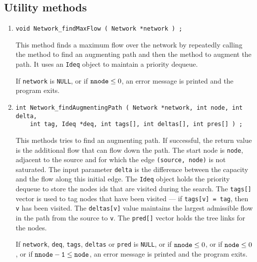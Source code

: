 \subsection{Utility methods}
\label{subsection:Network:proto:utilities}
\par
\begin{enumerate}
\item
\begin{verbatim}
void Network_findMaxFlow ( Network *network ) ;
\end{verbatim}
This method finds a maximum flow over the network by repeatedly
calling the method to find an augmenting path and then the method
to augment the path.
It uses an {\tt Ideq} object to maintain a priority dequeue.
\par {}
If {\tt network} is {\tt NULL},
or if ${\tt nnode} \le 0$,
an error message is printed and the program exits.
\item
\begin{verbatim}
int Network_findAugmentingPath ( Network *network, int node, int delta, 
    int tag, Ideq *deq, int tags[], int deltas[], int pres[] ) ;
\end{verbatim}
This methods tries to find an augmenting path.
If successful, the return value is the additional flow that can
flow down the path.
The start node is {\tt node}, adjacent to the source and for which
the edge {\tt (source, node)} is not saturated.
The input parameter {\tt delta} is the difference between the
capacity and the flow along this initial edge.
The {\tt Ideq} object holds the priority dequeue to store the nodes
ids that are visited  during the search.
The {\tt tags[]} vector is used to tag nodes that have been
visited --- if {\tt tags[v] = tag}, then {\tt v} has been visited.
The {\tt deltas[v]} value maintains the largest admissible flow in
the path from the source to {\tt v}.
The {\tt pred[]} vector holds the tree links for the nodes.
\par {}
If {\tt network}, {\tt deq}, {\tt tags}, {\tt deltas} or
{\tt pred} is {\tt NULL},
or if ${\tt nnode} \le 0$,
or if ${\tt node} \le 0$,
or if ${\tt nnode - 1} \le {\tt node}$,
an error message is printed and the program exits.

\end{enumerate}
